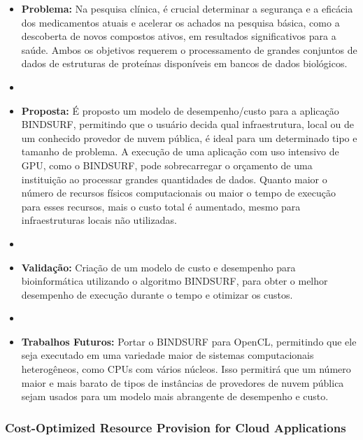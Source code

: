 \documentclass[tese,capa]{texufpel}
\begin{document}
\begin{itemize}[label={},noitemsep]
  \item \textbf{Problema:} Na pesquisa clínica, é crucial determinar a segurança e a eficácia dos medicamentos atuais e acelerar os achados na pesquisa básica, como a descoberta de novos compostos ativos, em resultados significativos para a saúde. Ambos os objetivos requerem o processamento de grandes conjuntos de dados de estruturas de proteínas disponíveis em bancos de dados biológicos.
  \item 
  \item \textbf{Proposta:} É proposto um modelo de desempenho/custo para a aplicação BINDSURF, permitindo que o usuário decida qual infraestrutura, local ou de um conhecido provedor de nuvem pública, é ideal para um determinado tipo e tamanho de problema. A execução de uma aplicação com uso intensivo de GPU, como o BINDSURF, pode sobrecarregar o orçamento de uma instituição ao processar grandes quantidades de dados. Quanto maior o número de recursos físicos computacionais ou maior o tempo de execução para esses recursos, mais o custo total é aumentado, mesmo para infraestruturas locais não utilizadas.
  \item 
  \item \textbf{Validação:} Criação de um modelo de custo e desempenho para bioinformática utilizando o algoritmo BINDSURF, para obter o melhor desempenho de execução durante o tempo e otimizar os custos.
  \item 
  \item \textbf{Trabalhos Futuros:} Portar o BINDSURF para OpenCL, permitindo que ele seja executado em uma variedade maior de sistemas computacionais heterogêneos, como CPUs com vários núcleos. Isso permitirá que um número maior e mais barato de tipos de instâncias de provedores de nuvem pública sejam usados para um modelo mais abrangente de desempenho e custo.
\end{itemize}

\subsubsection{Cost-Optimized Resource Provision for Cloud Applications \cite{shenCostOptimizedResourceProvision2014b}}
\end{document}
